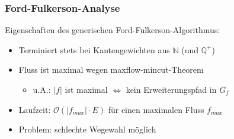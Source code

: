 \documentclass[draft]{beamer}
\newcommand{\ff}{Ford-Fulkerson}
\begin{document}
\begin{frame}
\frametitle{\ff-Analyse}
Eigenschaften des generischen \ff-Algorithmus:
\begin{itemize}
\item<1-> Terminiert stets bei Kantengewichten aus $\mathbb{N}$ (und $\mathbb{Q}^+$)
\item<2-> Fluss ist maximal wegen \alert{maxflow-mincut-Theorem} 
\begin{itemize}
\item u.A.: $\lvert f\rvert$ ist maximal $\Leftrightarrow$ kein Erweiterungspfad in $G_{f}$
\end{itemize}
\item<3-> Laufzeit: $\mathcal{O}(\lvert f_{max}\rvert \cdot E)$ für einen maximalen Fluss $f_{max}$
\item<4-> Problem: schlechte Wegewahl möglich
\end{itemize}
\end{frame}
\end{document}
